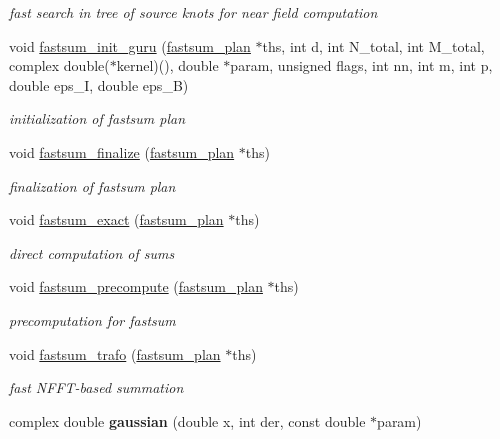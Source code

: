 \begin{CompactItemize}
\begin{CompactList}\small\item\em fast search in tree of source knots for near field computation \item\end{CompactList}\item 
void \hyperlink{group__applications__fastsum_ga13}{fastsum\_\-init\_\-guru} (\hyperlink{structfastsum__plan__}{fastsum\_\-plan} $\ast$ths, int d, int N\_\-total, int M\_\-total, complex double($\ast$kernel)(), double $\ast$param, unsigned flags, int nn, int m, int p, double eps\_\-I, double eps\_\-B)
\begin{CompactList}\small\item\em initialization of fastsum plan \item\end{CompactList}\item 
void \hyperlink{group__applications__fastsum_ga14}{fastsum\_\-finalize} (\hyperlink{structfastsum__plan__}{fastsum\_\-plan} $\ast$ths)
\begin{CompactList}\small\item\em finalization of fastsum plan \item\end{CompactList}\item 
void \hyperlink{group__applications__fastsum_ga15}{fastsum\_\-exact} (\hyperlink{structfastsum__plan__}{fastsum\_\-plan} $\ast$ths)
\begin{CompactList}\small\item\em direct computation of sums \item\end{CompactList}\item 
void \hyperlink{group__applications__fastsum_ga16}{fastsum\_\-precompute} (\hyperlink{structfastsum__plan__}{fastsum\_\-plan} $\ast$ths)
\begin{CompactList}\small\item\em precomputation for fastsum \item\end{CompactList}\item 
void \hyperlink{group__applications__fastsum_ga17}{fastsum\_\-trafo} (\hyperlink{structfastsum__plan__}{fastsum\_\-plan} $\ast$ths)
\begin{CompactList}\small\item\em fast NFFT-based summation \item\end{CompactList}\item 
\hypertarget{group__applications__fastsum_ga18}{
complex double {\bf gaussian} (double x, int der, const double $\ast$param)}
\label{group__applications__fastsum_ga18}


\end{CompactItemize}
